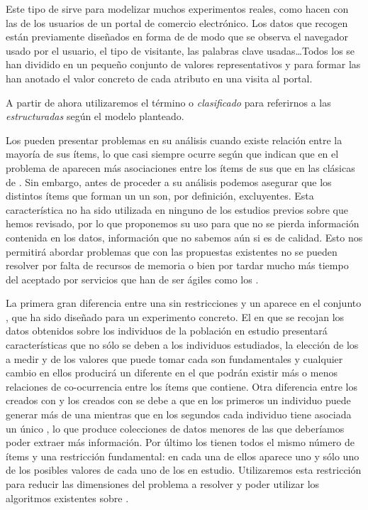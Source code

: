 Este tipo de \transacciones sirve para modelizar muchos experimentos reales, como hacen \citet{CarmonaRGallegoTorresBernalDelJesusGarcia-WUMtoImprovePortalDesign-2012} con las \sns de los usuarios de un portal de comercio electrónico. Los datos que recogen están previamente diseñados en forma de \atributos de modo que se observa el navegador usado por el usuario, el tipo de visitante, las palabras clave usadas\ldots Todos los \atributos se han dividido en un pequeño conjunto de valores representativos y para formar las \transacciones han anotado el valor concreto de cada atributo en una visita al portal.

A partir de ahora utilizaremos el término \registro o \registro \emph{clasificado} para referirnos a las \transacciones \emph{estructuradas} según el modelo planteado.

Los \registros pueden presentar problemas en su análisis cuando existe relación entre la mayoría de sus ítems, lo que casi siempre ocurre según \citet{LiuHsuMa-IntegratingClassificationAndARM-1998} que indican que en el problema de \Clasificacion aparecen más asociaciones entre los ítems de sus \datasets que en las clásicas \transacciones de \ARM. Sin embargo, antes de proceder a su análisis podemos asegurar que los distintos ítems que forman un un \atributo son, por definición, excluyentes. Esta característica no ha sido utilizada en ninguno de los estudios previos sobre \ARM que hemos revisado, por lo que proponemos su uso para que no se pierda información contenida en los datos, información que no sabemos aún si es de calidad. Esto nos permitirá abordar problemas que con las propuestas existentes no se pueden resolver por falta de recursos de memoria o bien por tardar mucho más tiempo del aceptado por servicios que han de ser ágiles como los \srs.

La primera gran diferencia entre una \transaccion sin restricciones y un \registro aparece en el conjunto \I, que ha sido diseñado para un experimento concreto. El \dataset en que se recojan los datos obtenidos sobre los individuos de la población en estudio presentará características que no sólo se deben a los individuos estudiados, la elección de los \atributos a medir y de los valores que puede tomar cada \atributo son fundamentales y cualquier cambio en ellos producirá un \dataset diferente en el que podrán existir más o menos relaciones de co-ocurrencia entre los ítems que contiene. Otra diferencia entre los \datasets creados con \transacciones y los creados con \registros se debe a que en los primeros un individuo puede generar más de una \transaccion mientras que en los segundos cada individuo tiene asociada un único \registro, lo que produce colecciones de datos menores de las que deberíamos poder extraer más información. Por último los \registros tienen todos el mismo número de ítems y una restricción fundamental: en cada una de ellos aparece uno y sólo uno de los posibles valores de cada uno de los \atributos en estudio. Utilizaremos esta restricción para reducir las dimensiones del problema a resolver y poder utilizar los algoritmos existentes sobre \ARM.

